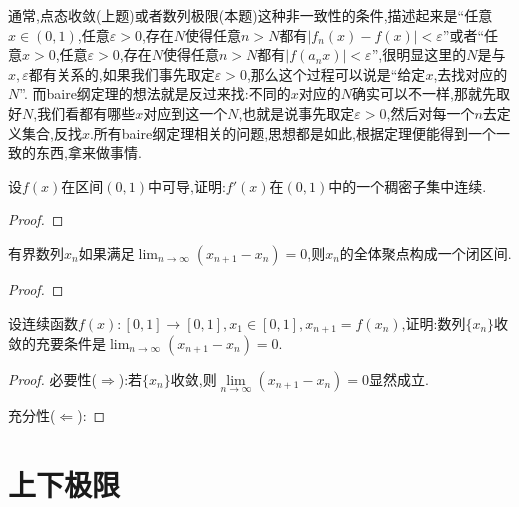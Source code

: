 \documentclass[lang=cn,newtx,10pt,scheme=chinese]{elegantbook}
\begin{document}
\begin{remark}
   通常,点态收敛(上题)或者数列极限(本题)这种非一致性的条件,描述起来是“任意\(x\in(0,1)\),任意\(\varepsilon > 0\),存在\(N\)使得任意\(n > N\)都有\(|f_n(x)-f(x)|<\varepsilon\)”或者“任意\(x > 0\),任意\(\varepsilon > 0\),存在\(N\)使得任意\(n > N\)都有\(|f(a_nx)|<\varepsilon\)”,很明显这里的\(N\)是与\(x,\varepsilon\)都有关系的,如果我们事先取定\(\varepsilon > 0\),那么这个过程可以说是“给定\(x\),去找对应的\(N\)”.
   而baire纲定理的想法就是反过来找:不同的\(x\)对应的\(N\)确实可以不一样,那就先取好\(N\),我们看都有哪些\(x\)对应到这一个\(N\),也就是说事先取定\(\varepsilon > 0\),然后对每一个\(n\)去定义集合,反找\(x\).所有baire纲定理相关的问题,思想都是如此,根据定理便能得到一个一致的东西,拿来做事情.
\end{remark}

\begin{example}
   设\(f(x)\)在区间\((0,1)\)中可导,证明:\(f'(x)\)在\((0,1)\)中的一个稠密子集中连续.
\end{example}
\begin{proof}
   
\end{proof}

\begin{lemma}
   有界数列\(x_n\)如果满足\(\lim_{n\to\infty}(x_{n + 1}-x_n)=0\),则\(x_n\)的全体聚点构成一个闭区间.
   \end{lemma}
   \begin{proof}
      
   \end{proof}
   
   \begin{example}
      设连续函数\(f(x):[0,1]\to[0,1],x_1\in[0,1],x_{n + 1}=f(x_n)\),证明:数列\(\{x_n\}\)收敛的充要条件是\(\lim_{n\to\infty}(x_{n + 1}-x_n)=0\).
   \end{example}
   \begin{proof}
      必要性($\Rightarrow$):若$\{x_n\}$收敛,则$\underset{n\rightarrow \infty}{\lim}\left( x_{n+1}-x_n \right) =0$显然成立.
   
      充分性($\Leftarrow$):
\end{proof}
   

\section{上下极限}
\end{document}
